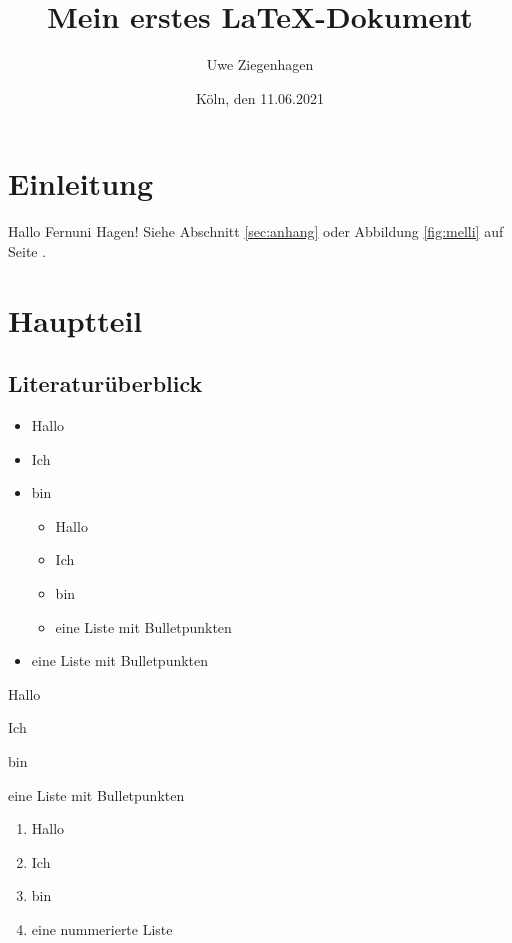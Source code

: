 \documentclass[ngerman,12pt]{scrartcl}
\title{Mein erstes \LaTeX-Dokument}
\author{Uwe Ziegenhagen}
\date{Köln, den 11.06.2021}
\begin{document}
\maketitle

\tableofcontents

\listoffigures

\section{Einleitung}

Hallo Fernuni Hagen! Siehe Abschnitt \ref{sec:anhang} oder Abbildung \ref{fig:melli} auf Seite \pageref{fig:melli}.

\section{Hauptteil}
\subsection{Literaturüberblick}

\begin{itemize}
\item Hallo
\item Ich 
\item bin 

\begin{itemize}
\item Hallo
\item Ich 
\item bin 
\item eine Liste mit Bulletpunkten
\end{itemize}

\item eine Liste mit Bulletpunkten
\end{itemize}

\begin{compactitem}[?]
\item Hallo
\item Ich 
\item bin 
\item eine Liste mit Bulletpunkten
\end{compactitem}

\begin{enumerate}[I] %
\item Hallo
\item Ich 
\item bin 
\item eine nummerierte Liste
\end{enumerate}
\end{document}
